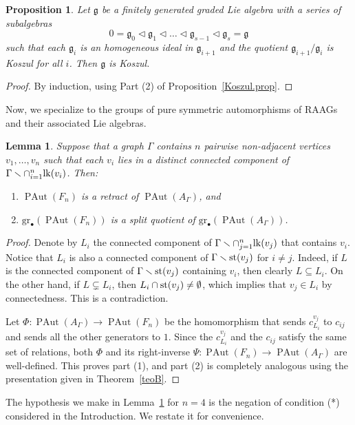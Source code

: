 \documentclass[10pt]{amsart}
\newtheorem{lemma}[theorem]{Lemma}
\newtheorem{prop}[theorem]{Proposition}
\theoremstyle{definition}
\newcommand{\lk}{{\rm lk}}
\newcommand{\st}{{\rm st}}
\newcommand{\PAut}{\operatorname{PAut}}
\newcommand{\g}{\mathfrak{g}}
\newcommand{\gr}{\mathrm{gr}_\bullet}
\theoremstyle{definition}
\numberwithin{equation}{section}
\begin{document}
\begin{prop}\label{polyRAAGLie} Let $\g$ be a finitely generated graded Lie algebra with a series of subalgebras
\[0=\g_0 \triangleleft \g_1 \triangleleft\ldots\triangleleft \g_{s-1}\triangleleft \g_s=\g\]
such that each $\g_i$ is an homogeneous ideal in $\g_{i+1}$ and the quotient $\g_{i+1}/\g_i$ is Koszul for all $i$.
Then $\g$ is Koszul.
\end{prop}
\begin{proof}
By induction, using Part (2) of Proposition~\ref{Koszul.prop}.
\end{proof}


Now, we specialize to the groups of pure symmetric automorphisms of RAAGs and their associated Lie algebras.

\begin{lemma} \label{l1}
 Suppose that a graph $\Gamma$ contains $n$ pairwise non-adjacent vertices $v_1, \ldots, v_n$ such that each $v_i$ lies in a distinct connected component of $\Gamma \smallsetminus \cap_{i=1}^n\lk(v_i)$. Then:
 \begin{enumerate}
  \item $\PAut(F_n)$ is a retract of $\PAut(A_\Gamma)$, and
  \item $\gr(\PAut(F_n))$ is a split quotient of $\gr(\PAut(A_{\Gamma}))$.
 \end{enumerate}
\end{lemma}
\begin{proof}
 Denote by $L_i$ the connected component of $\Gamma \smallsetminus \cap_{j=1}^n \lk(v_j)$ that contains $v_i$. Notice that
 $L_i$ is also a connected component of $\Gamma \smallsetminus \st(v_j)$ for $i \neq j$. Indeed, if $L$
 is the connected component of $\Gamma \smallsetminus \st(v_j)$ containing $v_i$, then clearly $L \subseteq L_i$. On the other hand, if $L \subsetneq L_i$, then $L_i \cap \st(v_j) \neq \emptyset$, which implies that $v_j \in L_i$ by connectedness. This is a contradiction.

 Let $\Phi \colon \PAut(A_\Gamma) \to \PAut(F_n)$ be the homomorphism that sends $c_{L_i}^{v_j}$ to $c_{ij}$ and sends all the other generators to $1$. Since the $c_{L_i}^{v_j}$ and the $c_{ij}$ satisfy the same set of relations, both $\Phi$ and its right-inverse $\Psi \colon \PAut(F_n)  \to \PAut(A_\Gamma)$ are well-defined. This proves part (1), and  part (2) is completely analogous using the presentation given in Theorem~\ref{teoB}.
\end{proof}

The hypothesis we make in Lemma~\ref{l1} for $n=4$ is the negation of condition (*) considered in the Introduction. We restate it for convenience.
\end{document}
